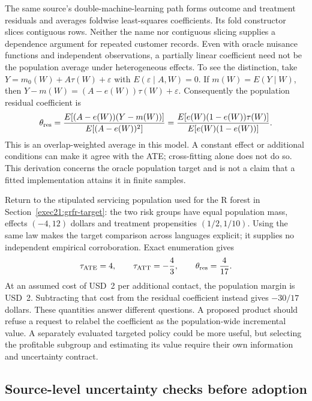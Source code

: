 The same source's double-machine-learning path forms outcome and treatment
residuals and averages foldwise least-squares coefficients. Its fold
constructor slices contiguous rows. Neither the name nor contiguous slicing
supplies a dependence argument for repeated customer records. Even with
oracle nuisance functions and independent observations, a partially linear
coefficient need not be the population average under heterogeneous effects.
To see the distinction, take
$Y=m_0(W)+A\tau(W)+\varepsilon$ with
$E(\varepsilon\mid A,W)=0$. If $m(W)=E(Y\mid W)$, then
$Y-m(W)=(A-e(W))\tau(W)+\varepsilon$. Consequently the population residual
coefficient is
\begin{equation}
\label{exec21:effects-residual}
 \theta_{\rm res}
 =\frac{E[(A-e(W))(Y-m(W))]}{E[(A-e(W))^2]}
 =\frac{E[e(W)(1-e(W))\tau(W)]}{E[e(W)(1-e(W))]}.
\end{equation}
This is an overlap-weighted average in this model. A constant effect or
additional conditions can make it agree with the ATE; cross-fitting alone
does not do so. This derivation concerns the oracle population target and is
not a claim that a fitted implementation attains it in finite samples.
\citep{exec21_effects_causalelm,exec21_effects_reference}

Return to the stipulated servicing population used for the R forest in
Section~\ref{exec21:grfr-target}: the two risk groups have equal population
mass, effects $(-4,12)$ dollars and treatment propensities $(1/2,1/10)$.
Using the same law makes the target comparison across languages explicit;
it supplies no independent empirical corroboration. Exact enumeration gives
\begin{equation}
\label{exec21:effects-targetexample}
 \tau_{\rm ATE}=4,\qquad
 \tau_{\rm ATT}=-\frac43,\qquad
 \theta_{\rm res}=\frac4{17}.
\end{equation}
At an assumed cost of USD~2 per additional contact, the population margin is
USD~2. Subtracting that cost from the residual coefficient instead gives
$-30/17$ dollars. These quantities answer different questions. A proposed
product should refuse a request to relabel the coefficient as the
population-wide incremental value. A separately evaluated targeted policy
could be more useful, but selecting the profitable subgroup and estimating
its value require their own information and uncertainty contract.
\citep{exec21_effects_reference}

\subsection{Source-level uncertainty checks before adoption}
\label{exec21:effects-uncertainty}

